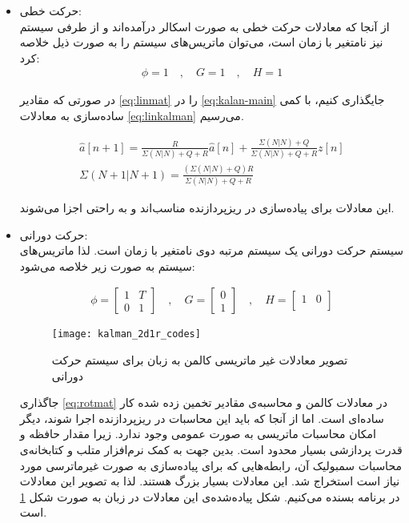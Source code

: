 \begin{itemize}
	\item حرکت خطی: \\
از آنجا که معادلات حرکت خطی به صورت اسکالر درآمده‌اند و از طرفی سیستم نیز نامتغیر با زمان است، می‌توان ماتریس‌های سیستم را به صورت ذیل خلاصه کرد:
\begin{gather}
	\phi = 1 \quad,\quad G = 1\quad,\quad H = 1 \label{eq:linmat}
\end{gather}

\newpage
در صورتی که مقادیر \ref{eq:linmat} را در \ref{eq:kalan-main} جایگذاری کنیم، با کمی ساده‌سازی به معادلات \ref{eq:linkalman} می‌رسیم.

\begin{gather}
	\hat{a}[n+1] = \frac{R}{\Sigma(N|N)+Q+R} \hat{a}[n] + \frac{\Sigma(N|N)+Q}{\Sigma(N|N)+Q+R}z[n] \nonumber \\
	\Sigma(N+1|N+1) = \frac{(\Sigma(N|N)+Q)R}{\Sigma(N|N)+Q+R} \label{eq:linkalman}
\end{gather}

این معادلات برای پیاده‌سازی در ریزپردازنده مناسب‌اند و به راحتی اجزا می‌شوند.

	\item  حرکت دورانی: \\
سیستم حرکت دورانی یک سیستم مرتبه دوی نامتغیر با زمان است. لذا ماتریس‌های سیستم به صورت زیر خلاصه می‌شود:

\begin{gather}
	\phi = 
	\begin{bmatrix}
		1 & T \\
		0 & 1
	\end{bmatrix}
	\quad , \quad
	G = 
	\begin{bmatrix}
		0 \\
		1
	\end{bmatrix}
	\quad,\quad
	H = 
	\begin{bmatrix}
		1 & 0 \\
	\end{bmatrix}
	\label{eq:rotmat}
\end{gather}

\begin{figure}[h]
	\centering
	\texttt{[image: kalman\_2d1r\_codes]}
	\caption{تصویر معادلات غیر ماتریسی کالمن به زبان  برای سیستم حرکت دورانی}
	\label{fig:kalman-2d1r-code}
\end{figure}

جاگذاری \ref{eq:rotmat} در معادلات کالمن و محاسبه‌ی مقادیر تخمین زده شده کار ساده‌ای است. اما از آنجا که باید این محاسبات در ریزپردازنده اجرا شوند، دیگر امکان محاسبات ماتریسی به صورت عمومی وجود ندارد. زیرا مقدار حافظه و قدرت پردازشی بسیار محدود است. بدین جهت به کمک نرم‌افزار متلب و کتابخانه‌ی محاسبات سمبولیک آن، رابطه‌هایی که برای پیاده‌سازی به صورت غیرماترسی مورد نیاز است استخراج شد. این معادلات بسیار بزرگ هستند. لذا به تصویر این معادلات در برنامه بسنده می‌کنیم. شکل پیاده‌شده‌ی این معادلات در زبان  به صورت شکل \ref{fig:kalman-2d1r-code} است.
\end{itemize}

